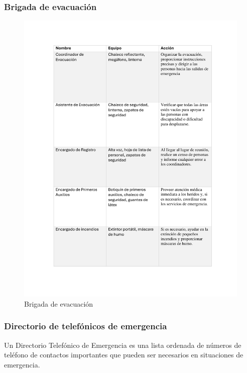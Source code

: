 \subsubsection{Brigada de evacuación}
\begin{figure}[H]
    \centering
    \includegraphics[scale=0.4]{13/img/brigada.pdf}
    \caption{Brigada de evacuación}
\end{figure}
% 
% 
\subsubsection{Directorio de telefónicos de emergencia}

Un Directorio Telefónico de Emergencia es una lista ordenada de números de teléfono de contactos importantes que pueden ser necesarios en situaciones de emergencia. 

